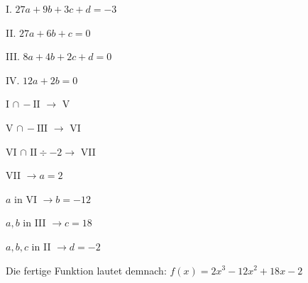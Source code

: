 I. $27a + 9b + 3c + d = -3$

II. $27a + 6b + c = 0$

III. $8a + 4b + 2c + d = 0$

IV. $12a + 2b = 0$


I $\cap\,-\text{II }\rightarrow$ V

V $\cap\,-\text{III }\rightarrow$ VI

VI $\cap \text{ II} \div -2 \rightarrow$ VII

VII $\rightarrow a = 2$

$a$ in VI $\rightarrow b = -12$

$a, b$ in III $\rightarrow c = 18$

$a, b, c$ in II $\rightarrow d = -2$

Die fertige Funktion lautet demnach: $f(x) = 2x^3 - 12x^2 + 18x - 2$ 

